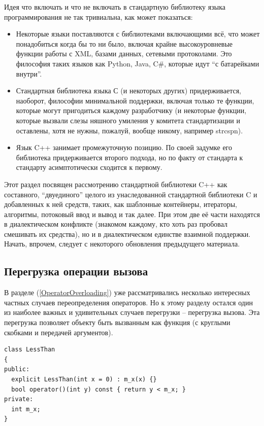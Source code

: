 \documentclass[a4paper,12pt,oneside]{article}
\begin{document}
Идея что включать и что не включать в стандартную библиотеку языка программирования не так тривиальна, как может показаться: 
\begin{itemize}
\item
Некоторые языки поставляются с библиотеками включающими всё, что может понадобиться когда бы то ни было, включая крайне высокоуровневые функции работы с XML, базами данных, сетевыми протоколами. Это философия таких языков как Python, Java, C\#, которые идут ``с батарейками внутри''.
\item
Стандартная библиотека языка С (и некоторых других) придерживается, наоборот, философии минимальной поддержки, включая только те функции, которые могут пригодиться каждому разработчику (и некоторые функции, которые вызвали слезы няшного умиления у комитета стандартизации и оставлены, хотя не нужны, пожалуй, вообще никому, например strcspn).
\item
Язык C++ занимает промежуточную позицию. По своей задумке его библиотека придерживается второго подхода, но по факту от стандарта к стандарту асимптотически сходится к первому.
\end{itemize}

Этот раздел посвящен рассмотрению стандартной библиотеки C++ как составного, ``двуединого'' целого из унаследованной стандартной библиотеки C и добавленных к ней средств, таких, как шаблонные контейнеры, итераторы, алгоритмы, потоковый ввод и вывод и так далее. При этом две её части находятся в диалектическом конфликте (знакомом каждому, кто хоть раз пробовал смешивать их средства), но и в диалектическом единстве взаимной поддержки. Начать, впрочем, следует с некоторого обновления предыдущего материала.

\subsection{Перегрузка операции вызова}

В разделе (\ref{OperatorOverloading}) уже рассматривались несколько интересных частных случаев переопределения операторов. Но к этому разделу остался один из наиболее важных и удивительных случаев перегрузки -- перегрузка вызова. Эта перегрузка позволяет объекту быть вызванным как функция (с круглыми скобками и передачей аргументов).

\begin{lstlisting}
class LessThan
{
public:
  explicit LessThan(int x = 0) : m_x(x) {}
  bool operator()(int y) const { return y < m_x; }
private:
  int m_x;
}
\end{lstlisting}
\end{document}
